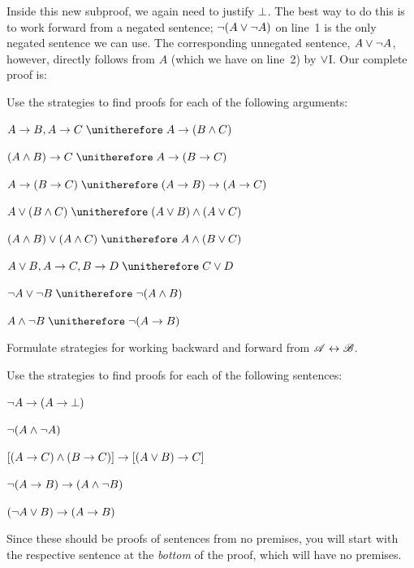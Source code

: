 Inside this new subproof, we again need to justify $\bot$. The best way to do this is to work forward from a negated sentence; $\neg(A \vee \neg A)$ on line~1 is the only negated sentence we can use. The corresponding unnegated sentence, $A \vee \neg A$, however, directly follows from $A$ (which we have on line~2) by $\vee$I. Our complete proof is:
\begin{fitchproof}
	\open
	\AS
	\open
	\AS
	\close
	\close
\end{fitchproof}

\practiceproblems

\problempart
Use the strategies to find proofs for each of the following arguments:
\begin{compactlist}
\item $A \eif B, A \eif C \therefore A \eif (B \eand C)$
\item $(A \eand B) \eif C \therefore A \eif (B \eif C)$
\item $A \eif (B \eif C) \therefore (A \eif B) \eif (A \eif C)$
\item $A \eor (B \eand C) \therefore (A \eor B) \eand (A \eor C)$
\item $(A \eand B) \eor (A \eand C) \therefore A \eand (B \eor C)$
\item $A \eor B, A \eif C, B \eif D \therefore C \eor D$
\item $\enot A \lor \enot B \therefore \enot(A \eand B)$
\item $A \eand \enot B \therefore \enot(A \eif B)$
\end{compactlist}

\problempart
Formulate strategies for working backward and forward from $\mathscr{A} \leftrightarrow \mathscr{B}$.

\problempart
Use the strategies to find proofs for each of the following sentences:
\begin{compactlist}
\item $\neg A \rightarrow (A \rightarrow \bot)$
\item $\neg(A \wedge \neg A)$
\item $[(A \rightarrow C) \wedge (B \rightarrow C)] \rightarrow [(A \lor B) \rightarrow C]$
\item $\neg(A \rightarrow B) \rightarrow (A \wedge \neg B)$
\item $(\neg A \vee B) \rightarrow (A \rightarrow B)$
\end{compactlist}
Since these should be proofs of sentences from no premises, you will start with the respective sentence at the \emph{bottom} of the proof, which will have no premises.

